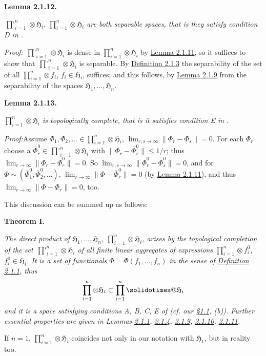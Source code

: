 \documentclass[12pt,b5paper,twoside]{article}
\makeatletter
\newcommand{\solidotimes}{\mathbin{\mathpalette\solidotimes@\relax}}
\newcommand{\solidotimes@}[2]{%
  \begingroup
  \setbox\z@=\hbox{$\m@th#1\bm{\otimes}$}%
  \@tempdima=.04\wd\z@
  \@tempdimb=.04\ht\z@
  \rlap{\kern-\@tempdima\copy\z@}%
  \rlap{\kern\@tempdima\copy\z@}%
  \rlap{\raise\@tempdimb\copy\z@}%
  \rlap{\lower\@tempdimb\copy\z@}%
  \box\z@
  \endgroup}
\newcommand{\Hspace}{\mathfrak H}
\newcommand{\Lemma}[1]{%
  \par\smallskip\noindent\phantomsection\label{lem:#1}\textbf{Lemma #1.}\enspace
}
\newcommand{\MainTheorem}[1]{%
  \par\smallskip\noindent\phantomsection\label{thm:#1}\textbf{Theorem #1.}\enspace
}
\newcommand{\Proof}{\par\noindent\textit{Proof:}\enspace}
\newcommand{\secref}[1]{\hyperref[sec:#1]{\S#1}}
\newcommand{\defref}[1]{\hyperref[def:#1]{Definition #1}}
\newcommand{\lemref}[1]{\hyperref[lem:#1]{Lemma #1}}
\makeatother
\begin{document}
\Lemma{2.1.12}
{\itshape
$\mathop{\prod\nolimits'}_{i=1}^{n}\otimes\Hspace_i$,
$\prod_{i=1}^{n}\otimes\Hspace_i$ are both separable spaces, that is they
satisfy condition D in \cite[p.~65]{ref16}.}

\Proof
$\mathop{\prod\nolimits'}_{i=1}^{n}\otimes\Hspace_i$ is dense in
$\prod_{i=1}^{n}\otimes\Hspace_i$ by \lemref{2.1.11}, so it suffices to show
that $\mathop{\prod\nolimits'}_{i=1}^{n}\otimes\Hspace_i$ is separable. By
\defref{2.1.3} the separability of the set of all
$\prod_{i=1}^{n}\otimes f_i$, $f_i\in\Hspace_i$, suffices; and this follows,
by \lemref{2.1.9} from the separability of the spaces
$\Hspace_1,\ldots,\Hspace_n$.

\Lemma{2.1.13}
{\itshape
$\prod_{i=1}^{n}\otimes\Hspace_i$ is topologically complete, that is it
satisfies condition E in \cite[p.~65]{ref16}.}

\Proof Assume
$\Phi_1,\Phi_2,\ldots\in\prod_{i=1}^{n}\otimes\Hspace_i$,
$\lim_{r,s\to\infty}\lVert\Phi_r-\Phi_s\rVert=0$. For each $\Phi_r$ choose
a $\overline{\Phi}_r^0\in
\mathop{\prod\nolimits'}_{i=1}^{n}\otimes\Hspace_i$ with
$\lVert\Phi_r-\overline{\Phi}_r^0\rVert\leq1/r$; thus
$\lim_{r\to\infty}\lVert\Phi_r-\overline{\Phi}_r^0\rVert=0$. So
$\lim_{r,s\to\infty}\lVert\overline{\Phi}_r^0-
\overline{\Phi}_s^0\rVert=0$, and for
$\Phi\sim(\overline{\Phi}_1^0,\overline{\Phi}_2^0,\ldots)$,
$\lim_{r\to\infty}\lVert\Phi-\overline{\Phi}_r^0\rVert=0$
(by \lemref{2.1.11}), and
thus $\lim_{r\to\infty}\lVert\Phi-\Phi_r\rVert=0$, too.

This discussion can be summed up as follows:

\MainTheorem{I}
{\itshape
The direct product of $\Hspace_1,\ldots,\Hspace_n$,
$\prod_{i=1}^{n}\otimes\Hspace_i$, arises by the topological completion of
the set $\mathop{\prod\nolimits'}_{i=1}^{n}\otimes\Hspace_i$ of all finite
linear aggregates of expressions $\prod_{i=1}^{n}\otimes f_i^0$,
$f_i^0\in\Hspace_i$. It is a set of functionals
$\Phi=\Phi(f_1,\ldots,f_n)$ in the sense of \defref{2.1.1}, thus
\[
 \prod_{i=1}^{n}\otimes\Hspace_i
 \subset\prod_{i=1}^{n}\solidotimes\Hspace_i
\]
and it is a space satisfying conditions A, B, C, E of
\cite[pp.~64--65]{ref16} (cf. our \secref{1.1}, (b)). Further essential
properties are given in Lemmas \hyperref[lem:2.1.1]{2.1.1},
\hyperref[lem:2.1.4]{2.1.4}, \hyperref[lem:2.1.9]{2.1.9},
\hyperref[lem:2.1.10]{2.1.10}, \hyperref[lem:2.1.11]{2.1.11}.}

If $n=1$, $\prod_{i=1}^{n}\otimes\Hspace_i$ coincides not only in our
notation with $\Hspace_1$, but in reality too.
\end{document}
